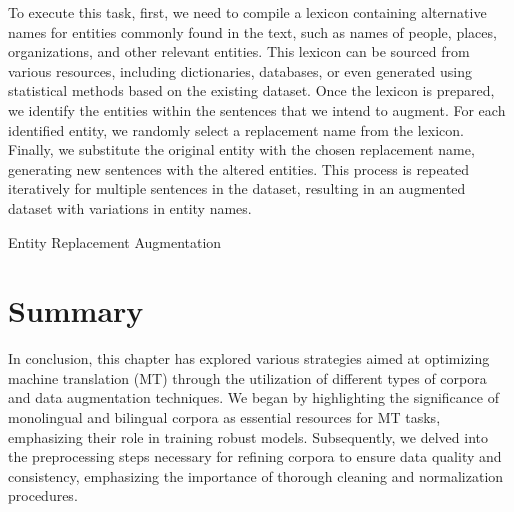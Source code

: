 To execute this task, first, we need to compile a lexicon containing alternative names for entities commonly found in the text, such as names of people, places, organizations, and other relevant entities. 
This lexicon can be sourced from various resources, including dictionaries, databases, or even generated using statistical methods based on the existing dataset. 
Once the lexicon is prepared, we identify the entities within the sentences that we intend to augment. 
For each identified entity, we randomly select a replacement name from the lexicon. 
Finally, we substitute the original entity with the chosen replacement name, generating new sentences with the altered entities. 
This process is repeated iteratively for multiple sentences in the dataset, resulting in an augmented dataset with variations in entity names.

\begin{algorithm}[H]
	\SetAlgoLined
	\BlankLine
	\caption{Entity Replacement Augmentation}
\end{algorithm}

\section{Summary}
In conclusion, this chapter has explored various strategies aimed at optimizing machine translation (MT) through the utilization of different types of corpora and data augmentation techniques. 
We began by highlighting the significance of monolingual and bilingual corpora as essential resources for MT tasks, emphasizing their role in training robust models. 
Subsequently, we delved into the preprocessing steps necessary for refining corpora to ensure data quality and consistency, emphasizing the importance of thorough cleaning and normalization procedures. 

